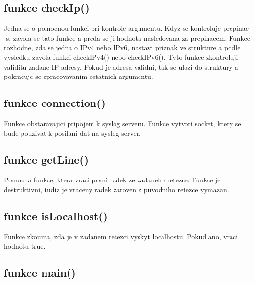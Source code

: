 \documentclass[a4paper]{article}
\begin{document}
	\subsection{funkce checkIp()}

	Jedna se o pomocnou funkci pri kontrole argumentu. Kdyz se kontroluje prepinac -s, zavola se tato funkce a preda se ji hodnota nasledovana za prepinacem. Funkce rozhodne, zda se jedna o IPv4 nebo IPv6, nastavi priznak ve strukture a podle vysledku zavola funkci checkIPv4() nebo checkIPv6(). Tyto funkce zkontroluji validitu zadane IP adresy. Pokud je adresa validni, tak se ulozi do struktury a pokracuje se zpracovavanim ostatnich argumentu.

	\subsection{funkce connection()}

	Funkce obstaravajici pripojeni k syslog serveru. Funkce vytvori socket, ktery se bude pouzivat k posilani dat na syslog server.

	\subsection{funkce getLine()}

	Pomocna funkce, ktera vraci prvni radek ze zadaneho retezce. Funkce je destruktivni, tudiz je vraceny radek zaroven z puvodniho retezce vymazan.

	\subsection{funkce isLocalhost()}

	Funkce zkouma, zda je v zadanem retezci vyskyt localhostu. Pokud ano, vraci hodnotu true.

	\subsection{funkce main()}
\end{document}
